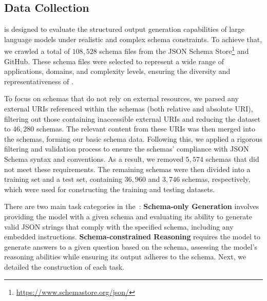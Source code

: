 \subsection{Data Collection}
\ourbench\space is designed to evaluate the structured output generation capabilities of large language models under realistic and complex schema constraints. To achieve that, we crawled a total of $108,528$ schema files from the JSON Schema Store\footnote{\url{https://www.schemastore.org/json/}} and GitHub. These schema files were selected to represent a wide range of applications, domains, and complexity levels, ensuring the diversity and representativeness of \ourbench.

To focus on schemas that do not rely on external resources, we parsed any external URIs referenced within the schemas (both relative and absolute URI), filtering out those containing inaccessible external URIs and reducing the dataset to $46,280$ schemas. The relevant content from these URIs was then merged into the schemas, forming our basic schema data. Following this, we applied a rigorous filtering and validation process to ensure the schemas' compliance with JSON Schema syntax and conventions. As a result, we removed $5,574$ schemas that did not meet these requirements. The remaining schemas were then divided into a training set and a test set, containing $36,960$ and $3,746$ schemas, respectively, which were used for constructing the training and testing datasets.

There are two main task categories in the~\ourbench:
\textbf{Schema-only Generation} involves providing the model with a given schema and evaluating its ability to generate valid JSON strings that comply with the specified schema, including any embedded instructions.
\textbf{Schema-constrained Reasoning} requires the model to generate answers to a given question based on the schema, assessing the model's reasoning abilities while ensuring its output adheres to the schema.
Next, we detailed the construction of each task.

